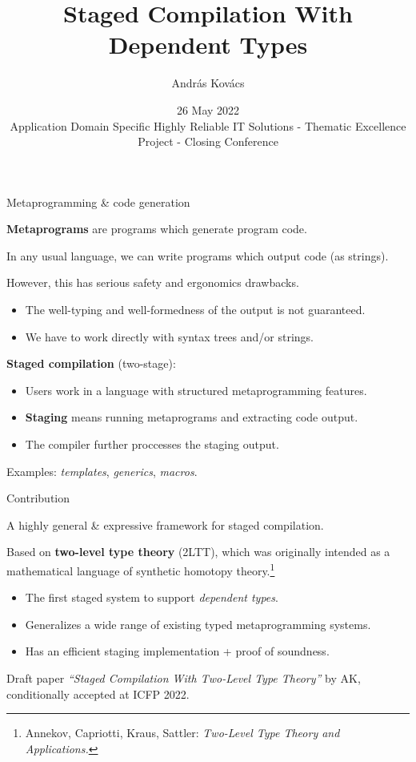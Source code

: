 \documentclass[dvipsnames]{beamer}
\title{Staged Compilation With Dependent Types}
\author{András Kovács}
\institute{Eötvös Loránd University}
\date{26 May 2022 \\ \vspace{0.5em}\footnotesize{Application Domain Specific Highly Reliable IT Solutions - Thematic Excellence Project - Closing Conference}}
\newcommand{\vsp}{\vspace{1em}}
\begin{document}
\frame{\titlepage}

\begin{frame}{Metaprogramming \& code generation}

\textbf{Metaprograms} are programs which generate program code.
\vsp
\pause

In any usual language, we can write programs which output code (as strings).
\vsp
\pause

However, this has serious \alert{safety} and \alert{ergonomics} drawbacks.
\begin{itemize}
  \item The well-typing and well-formedness of the output is \alert{not guaranteed}.
  \item We have to work directly with syntax trees and/or strings.
\end{itemize}
\vsp
\pause

\textbf{Staged compilation} (two-stage):
\begin{itemize}
 \item Users work in a language with structured metaprogramming features.
 \item \textbf{Staging} means running metaprograms and extracting code output.
 \item The compiler further proccesses the staging output.
\end{itemize}
\vspace{0.5em}
\pause

\begin{exampleblock}{}Examples: \emph{templates}, \emph{generics}, \emph{macros}.
\end{exampleblock}

\end{frame}

\begin{frame}{Contribution}

A highly general \& expressive framework for staged compilation.
\vsp
\pause

Based on \textbf{two-level type theory} (2LTT), which was originally intended
as a mathematical language of synthetic homotopy theory.\footnote{Annekov, Capriotti, Kraus, Sattler: \emph{Two-Level Type Theory and Applications.}}
\vsp
\pause

\begin{itemize}
  \item The first staged system to support \emph{dependent types}.
  \item Generalizes a wide range of existing typed metaprogramming systems.
  \item Has an efficient staging implementation + proof of soundness.
\end{itemize}
\vsp
\pause

Draft paper \emph{``Staged Compilation With Two-Level Type Theory''} by AK,
conditionally accepted at ICFP 2022.
\end{frame}
\end{document}
